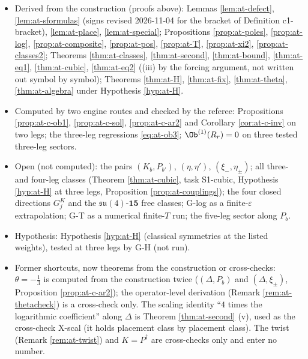 \begin{itemize}
\item Derived from the construction (proofs above): Lemmas \ref{lem:at-defect}, \ref{lem:at-sformulas} (signs revised 2026-11-04 for the bracket of Definition c1-bracket), \ref{lem:at-place}, \ref{lem:at-special}; Propositions \ref{prop:at-poles}, \ref{prop:at-log}, \ref{prop:at-composite}, \ref{prop:at-pos}, \ref{prop:at-T}, \ref{prop:at-xi2}, \ref{prop:at-classes2}; Theorems \ref{thm:at-classes}, \ref{thm:at-second}, \ref{thm:at-bound}, \ref{thm:at-eq1}, \ref{thm:at-cubic}, \ref{thm:at-eq2} ((iii) by the forcing argument, not written out symbol by symbol); Theorems \ref{thm:at-H}, \ref{thm:at-fix}, \ref{thm:at-theta}, \ref{thm:at-algebra} under Hypothesis \ref{hyp:at-H}.
\item Computed by two engine routes and checked by the referee: Propositions \ref{prop:at-c-ob1}, \ref{prop:at-c-sol}, \ref{prop:at-c-ar2} and Corollary \ref{cor:at-c-inv} on two legs; the three-leg regressions \eqref{eq:at-ob3}; $\Ob^{(1)}(R_r)=0$ on three tested three-leg sectors.
\item Open (not computed): the pairs $(K_b,P_{b'})$, $(\eta,\eta')$, $(\xi_-,\eta_\pm)$; all three- and four-leg classes (Theorem \ref{thm:at-cubic}, task S1-cubic, Hypothesis \ref{hyp:at-H} at three legs, Proposition \ref{prop:at-couplings}); the four closed directions $G^K_j$ and the $\mathfrak{su}(4)$-$\mathbf{15}$ free classes; G-log as a finite-$\varepsilon$ extrapolation; G-T as a numerical finite-$T$ run; the five-leg sector along $P_b$.
\item Hypothesis: Hypothesis \ref{hyp:at-H} (classical symmetries at the listed weights), tested at three legs by G-H (not run).
\item Former shortcuts, now theorems from the construction or cross-checks: $\theta=-\tfrac13$ is computed from the construction twice ($(\Delta,P_b)$ and $(\Delta,\xi_\pm)$, Proposition \ref{prop:at-c-ar2}); the operator-level derivation (Remark \ref{rem:at-thetacheck}) is a cross-check only. The scaling identity ``$4$ times the logarithmic coefficient'' along $\Delta$ is Theorem \ref{thm:at-second} (v), used as the cross-check X-scal (it holds placement class by placement class). The twist (Remark \ref{rem:at-twist}) and $K=P^\dagger$ are cross-checks only and enter no number.
\end{itemize}


